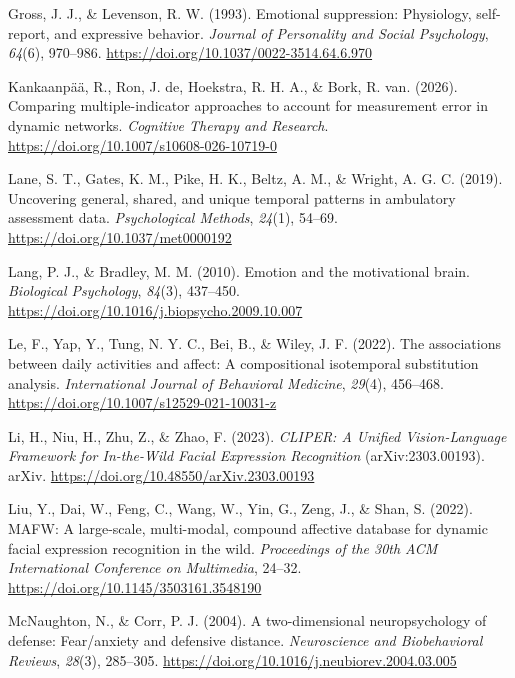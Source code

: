 \documentclass[
]{article}
\newlength{\cslhangindent}
\newenvironment{CSLReferences}[2] %
 {\begin{list}{}{%
  \setlength{\itemindent}{0pt}
  \setlength{\leftmargin}{0pt}
  \setlength{\parsep}{0pt}
  \ifodd #1
   \setlength{\leftmargin}{\cslhangindent}
   \setlength{\itemindent}{-1\cslhangindent}
  \fi
  \setlength{\itemsep}{#2\baselineskip}}}
 {\end{list}}
\begin{document}
\begin{CSLReferences}{1}{0}
Gross, J. J., \& Levenson, R. W. (1993). Emotional suppression:
Physiology, self-report, and expressive behavior. \emph{Journal of
Personality and Social Psychology}, \emph{64}(6), 970--986.
\url{https://doi.org/10.1037/0022-3514.64.6.970}

Kankaanpää, R., Ron, J. de, Hoekstra, R. H. A., \& Bork, R. van. (2026).
Comparing multiple-indicator approaches to account for measurement error
in dynamic networks. \emph{Cognitive Therapy and Research}.
\url{https://doi.org/10.1007/s10608-026-10719-0}

Lane, S. T., Gates, K. M., Pike, H. K., Beltz, A. M., \& Wright, A. G.
C. (2019). Uncovering general, shared, and unique temporal patterns in
ambulatory assessment data. \emph{Psychological Methods}, \emph{24}(1),
54--69. \url{https://doi.org/10.1037/met0000192}

Lang, P. J., \& Bradley, M. M. (2010). Emotion and the motivational
brain. \emph{Biological Psychology}, \emph{84}(3), 437--450.
\url{https://doi.org/10.1016/j.biopsycho.2009.10.007}

Le, F., Yap, Y., Tung, N. Y. C., Bei, B., \& Wiley, J. F. (2022). The
associations between daily activities and affect: A compositional
isotemporal substitution analysis. \emph{International Journal of
Behavioral Medicine}, \emph{29}(4), 456--468.
\url{https://doi.org/10.1007/s12529-021-10031-z}

Li, H., Niu, H., Zhu, Z., \& Zhao, F. (2023). \emph{{CLIPER}: {A Unified
Vision-Language Framework} for {In-the-Wild Facial Expression
Recognition}} (arXiv:2303.00193). {arXiv}.
\url{https://doi.org/10.48550/arXiv.2303.00193}

Liu, Y., Dai, W., Feng, C., Wang, W., Yin, G., Zeng, J., \& Shan, S.
(2022). {MAFW}: A large-scale, multi-modal, compound affective database
for dynamic facial expression recognition in the wild. \emph{Proceedings
of the 30th ACM International Conference on Multimedia}, 24--32.
\url{https://doi.org/10.1145/3503161.3548190}

McNaughton, N., \& Corr, P. J. (2004). A two-dimensional neuropsychology
of defense: Fear/anxiety and defensive distance. \emph{Neuroscience and
Biobehavioral Reviews}, \emph{28}(3), 285--305.
\url{https://doi.org/10.1016/j.neubiorev.2004.03.005}


\end{CSLReferences}
\end{document}
